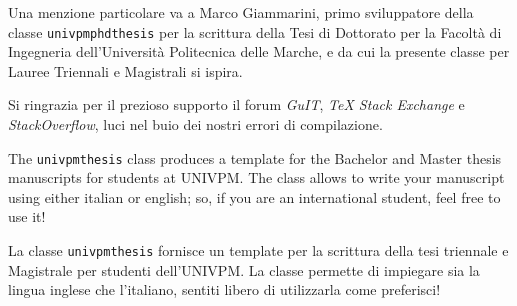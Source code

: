 \documentclass[a4print,english,lof,lot,twoside]{univpmthesis}
\begin{document}
\frontmatter

\maketitle

\begin{thesisacknowledge}[italian]
	 Una menzione particolare va a Marco Giammarini, primo sviluppatore della classe \texttt{univpmphdthesis} per la scrittura della Tesi di Dottorato per la Facoltà di Ingegneria dell'Università Politecnica delle Marche, e da cui la presente classe per Lauree Triennali e Magistrali si ispira.
	 
	 Si ringrazia per il prezioso supporto il forum \emph{GuIT}, \emph{TeX Stack Exchange} e \emph{StackOverflow}, luci nel buio dei nostri errori di compilazione.
\end{thesisacknowledge}

\begin{thesisabstract}[english]
	The \texttt{univpmthesis} class produces a template for the Bachelor and Master thesis manuscripts for students at UNIVPM. The class allows to write your manuscript using either italian or english; so, if you are an international student, feel free to use it!
\end{thesisabstract}

\begin{thesisabstract}[italian]
	La classe \texttt{univpmthesis} fornisce un template per la scrittura della tesi triennale e Magistrale per studenti dell'UNIVPM. La classe permette di impiegare sia la lingua inglese che l'italiano, sentiti libero di utilizzarla come preferisci!
\end{thesisabstract}

\thesistoc

\mainmatter



\backmatter

%
%



\end{document}
